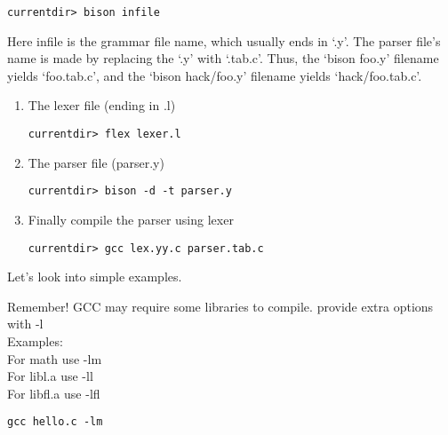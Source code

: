 \begin{commandline}
  \begin{verbatim}
currentdir> bison infile
  \end{verbatim}
\end{commandline}
\begin{info}Here infile is the grammar file name, which usually ends in `.y'. The parser file's name is made by replacing the `.y' with `.tab.c'. Thus, the `bison foo.y' filename yields `foo.tab.c', and the `bison hack/foo.y' filename yields `hack/foo.tab.c'.
\end{info}

\begin{enumerate}
  \item The lexer file (ending in .l)
  \begin{file}[lexer.l]
    
  \end{file}
  \begin{commandline}
    \begin{verbatim}
currentdir> flex lexer.l
    \end{verbatim}
  \end{commandline}
  \item  The parser file (parser.y)
  \begin{file}[parser.y]
    
  \end{file}
  \begin{commandline}
    \begin{verbatim}
currentdir> bison -d -t parser.y
    \end{verbatim}
  \end{commandline}

  \item Finally compile the parser using lexer
  \begin{commandline}
    \begin{verbatim}
currentdir> gcc lex.yy.c parser.tab.c
    \end{verbatim}
  \end{commandline}
\end{enumerate}

Let's look into simple examples.

\begin{file}[ex1.l]
  
\end{file}

\begin{file}[ex1.y]
  
\end{file}

\begin{info} Remember!
  GCC may require some libraries to compile.
  provide extra options with -l\\
  Examples:\\
  For math use -lm \\
  For libl.a use -ll \\
  For libfl.a use -lfl \\
  \begin{commandline}
    \begin{verbatim}
gcc hello.c -lm
    \end{verbatim}
  \end{commandline}
\end{info}
